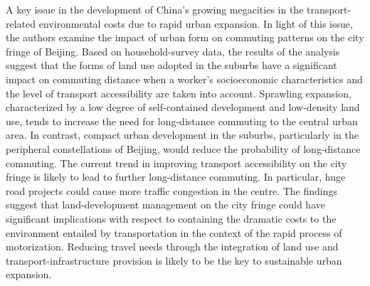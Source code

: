  A key issue in the development of China's growing megacities in the transport-related environmental costs due to rapid urban expansion. In light of this issue, the authors examine the impact of urban form on commuting patterns on the city fringe of Beijing. Based on household-survey data, the results of the analysis suggest that the forms of land use adopted in the suburbs have a significant impact on commuting distance when a worker's socioeconomic characteristics and the level of transport accessibility are taken into account. Sprawling expansion, characterized by a low degree of self-contained development and low-density land use, tends to increase the need for long-distance commuting to the central urban area. In contrast, compact urban development in the suburbs, particularly in the peripheral constellations of Beijing, would reduce the probability of long-distance commuting. The current trend in improving transport accessibility on the city fringe is likely to lead to further long-distance commuting. In particular, huge road projects could cause more traffic congestion in the centre. The findings suggest that land-development management on the city fringe could have significant implications with respect to containing the dramatic costs to the environment entailed by transportation in the context of the rapid process of motorization. Reducing travel needs through the integration of land use and transport-infrastructure provision is likely to be the key to sustainable urban expansion. 